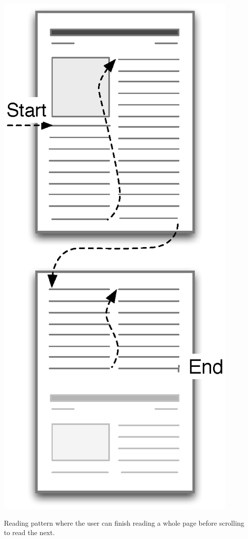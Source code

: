 \begin{sidefigure}%
	\myfloatalign%
	\includegraphics[width=\marginparwidth]{img/reading2} 
	\caption{Reading pattern where the user can finish reading a whole page before scrolling to read the next.}%
	\label{fig:reading2}%
\end{sidefigure}

